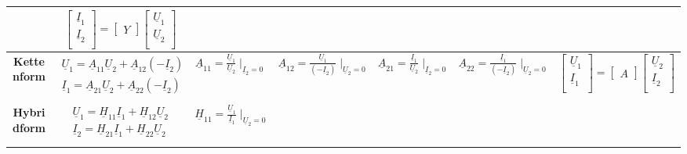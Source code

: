 \begin{table}
\begin{tabular}{| c | c | c | c | c | c | c |}
			&$ \begin{bmatrix}
					\underline{I}_{1}\\
					\underline{I}_{2}\\
				\end{bmatrix}
				=
				\begin{bmatrix}
					Y
				\end{bmatrix}
				\begin{bmatrix}
					\underline{U}_{1}\\
					\underline{U}_{2}\\
				\end{bmatrix}$\\
		\hline
			\textbf{Kettenform}
			& $ \begin{matrix}
					\underline{U}_{1}=\underline{A}_{11}\underline{U}_{2}+\underline{A}_{12}(-\underline{I}_{2})\\
					\underline{I}_{1}=\underline{A}_{21}\underline{U}_{2}+\underline{A}_{22}(-\underline{I}_{2})\\
					\end{matrix}$
			& $\underline{A}_{11}=\frac{\underline{U}_{1}}{\underline{U}_{2}} \mid_{\underline{I}_2=0}$
			& $\underline{A}_{12}=\frac{\underline{U}_{1}}{(-\underline{I}_{2})}
			\mid_{\underline{U}_2=0}$ & $\underline{A}_{21}=\frac{\underline{I}_{1}}{\underline{U}_{2}} \mid_{\underline{I}_2=0}$
			& $\underline{A}_{22}=\frac{\underline{I}_{1}}{(-\underline{I}_{2})}
			\mid_{\underline{U}_2=0}$ & $ \begin{bmatrix}
					\underline{U}_{1}\\
					\underline{I}_{1}\\
				\end{bmatrix}
				=
				\begin{bmatrix}
					A
				\end{bmatrix}
				\begin{bmatrix}
					\underline{U}_{2}\\
					\underline{I}_{2}\\
				\end{bmatrix}$\\
		\hline
			\textbf{Hybridform}
			& $ \begin{matrix}
					\underline{U}_{1}=\underline{H}_{11}\underline{I}_{1}+\underline{H}_{12}\underline{U}_{2}\\
					\underline{I}_{2}=\underline{H}_{21}\underline{I}_{1}+\underline{H}_{22}\underline{U}_{2}\\
				\end{matrix}$
			& $\underline{H}_{11}=\frac{\underline{U}_{1}}{\underline{I}_{1}} \mid_{\underline{U}_2=0}$

\end{tabular}
\end{table}

